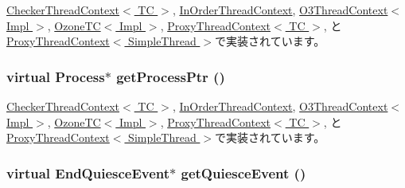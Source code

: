 \hyperlink{classCheckerThreadContext_a01ed2104c846a24a0e18594d3a2f7de9}{CheckerThreadContext$<$ TC $>$}, \hyperlink{classInOrderThreadContext_a01ed2104c846a24a0e18594d3a2f7de9}{InOrderThreadContext}, \hyperlink{classO3ThreadContext_ad157aa6157fa2020e52d8349e448df28}{O3ThreadContext$<$ Impl $>$}, \hyperlink{classOzoneCPU_1_1OzoneTC_a01ed2104c846a24a0e18594d3a2f7de9}{OzoneTC$<$ Impl $>$}, \hyperlink{classProxyThreadContext_a01ed2104c846a24a0e18594d3a2f7de9}{ProxyThreadContext$<$ TC $>$}, と \hyperlink{classProxyThreadContext_a01ed2104c846a24a0e18594d3a2f7de9}{ProxyThreadContext$<$ SimpleThread $>$}で実装されています。\hypertarget{classThreadContext_a8725d0e5dce89a4a086c7de4bb9d4454}{
\subsubsection[{getProcessPtr}]{\setlength{\rightskip}{0pt plus 5cm}virtual {\bf Process}$\ast$ getProcessPtr ()}}
\label{classThreadContext_a8725d0e5dce89a4a086c7de4bb9d4454}


\hyperlink{classCheckerThreadContext_a4b26cb784639047bab9de2b306955c4b}{CheckerThreadContext$<$ TC $>$}, \hyperlink{classInOrderThreadContext_a4b26cb784639047bab9de2b306955c4b}{InOrderThreadContext}, \hyperlink{classO3ThreadContext_aad103282d1faec25766034788dd59911}{O3ThreadContext$<$ Impl $>$}, \hyperlink{classOzoneCPU_1_1OzoneTC_a4b26cb784639047bab9de2b306955c4b}{OzoneTC$<$ Impl $>$}, \hyperlink{classProxyThreadContext_a4b26cb784639047bab9de2b306955c4b}{ProxyThreadContext$<$ TC $>$}, と \hyperlink{classProxyThreadContext_a4b26cb784639047bab9de2b306955c4b}{ProxyThreadContext$<$ SimpleThread $>$}で実装されています。\hypertarget{classThreadContext_ace05cbb8c4644ab69ad2ce815a259669}{
\subsubsection[{getQuiesceEvent}]{\setlength{\rightskip}{0pt plus 5cm}virtual {\bf EndQuiesceEvent}$\ast$ getQuiesceEvent ()}}
\label{classThreadContext_ace05cbb8c4644ab69ad2ce815a259669}


